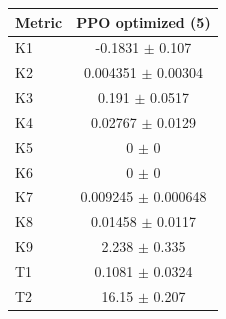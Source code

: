 \begin{tabular}{lc}
\toprule
Metric & PPO optimized (5) \\
\midrule
K1 & -0.1831 $\pm$ 0.107 \\
K2 & 0.004351 $\pm$ 0.00304 \\
K3 & 0.191 $\pm$ 0.0517 \\
K4 & 0.02767 $\pm$ 0.0129 \\
K5 & 0 $\pm$ 0 \\
K6 & 0 $\pm$ 0 \\
K7 & 0.009245 $\pm$ 0.000648 \\
K8 & 0.01458 $\pm$ 0.0117 \\
K9 & 2.238 $\pm$ 0.335 \\
T1 & 0.1081 $\pm$ 0.0324 \\
T2 & 16.15 $\pm$ 0.207 \\
\bottomrule
\end{tabular}
